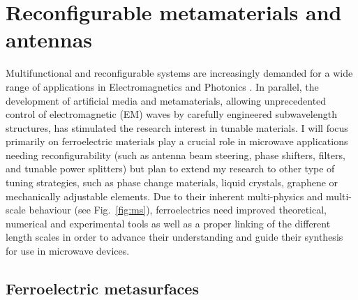 \documentclass[11pt]{academia}
\begin{document}
 \newpage

\section{Reconfigurable metamaterials and antennas}



Multifunctional and reconfigurable systems are increasingly demanded for
a wide range of applications in Electromagnetics and Photonics
\autocite{oliveriReconfigurableElectromagneticsMetamaterials2015}. 
In parallel, the development of artificial media and metamaterials, allowing unprecedented
control of electromagnetic (EM) waves by carefully engineered
subwavelength structures, has stimulated the research interest in
tunable materials.  I will focus 
primarily on ferroelectric materials
play a crucial role in microwave applications needing reconfigurability
\autocite{tagantsevFerroelectricMaterialsMicrowave2018} (such as antenna beam steering, phase shifters, filters, and tunable power
splitters) but plan to extend my research to other type of tuning 
strategies, such as phase change materials, liquid crystals, graphene or 
mechanically adjustable elements. Due to their inherent
multi-physics and multi-scale behaviour (see Fig.~\ref{fig:ms}),
ferroelectrics need improved theoretical, numerical and experimental 
tools as well as a proper linking of the different length scales in order to advance
their understanding and guide their synthesis for use in microwave
devices.


\hypertarget{sec:meta}{%
\subsection{Ferroelectric metasurfaces}\label{sec:ferrometasurf}}
\end{document}
